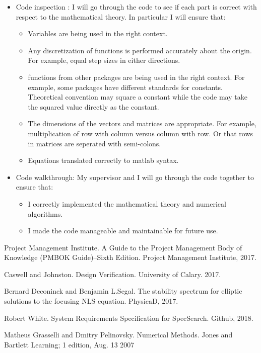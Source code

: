 \documentclass[12pt, titlepage]{article}
\begin{document}
\begin{itemize}
	\item Code inspection : I will 
	go through the code to see if each part is correct with respect to the
	mathematical theory. In particular I will ensure that: 
	\begin{itemize}
		\item Variables are being used in the right context. 
		\item Any discretization of functions is performed accurately about the 
		origin. For example, equal step sizes in either directions. 
		\item functions from other packages are being used in the right 
		context. For example, some packages have different standards for 
		constants. Theoretical convention may square a constant while the code 
		may take the squared value directly as the constant. 
		\item The dimensions of the vectors and matrices are appropriate. For 
		example, multiplication of row with column versus column with row. Or 
		that rows in matrices are seperated with semi-colons. 
		\item Equations translated correctly to matlab syntax.  
	\end{itemize} 
	\item Code walkthrough: My supervisor and I will go through the code 
	together to ensure that: 
	\begin{itemize}
		\item I correctly implemented the mathematical theory and numerical 
		algorithms.
		\item I made the code manageable and maintainable for future use.
	\end{itemize}
\end{itemize}
				


\newpage 
\begin{thebibliography}{9} 
	Project Management Institute. 
	A Guide to the Project Management Body of Knowledge (PMBOK Guide)–Sixth 
	Edition. 
	Project Management Institute, 2017. 
	
	Caswell and Johnston. 
	Design Verification. 
	University of Calary. 2017. 
	
	Bernard Deconinck and Benjamin L.Segal. 
	The stability spectrum for elliptic solutions to the focusing NLS equation. 
	PhysicaD, 2017. 
	 
	Robert White. 
	System Requirements Specification for SpecSearch. 
	Github, 2018. 
	
	Matheus Grasselli and Dmitry Pelinovsky. 
	Numerical Methods. 
	Jones and Bartlett Learning; 1 edition, Aug. 13 2007
	
\end{thebibliography} 
\end{document}
